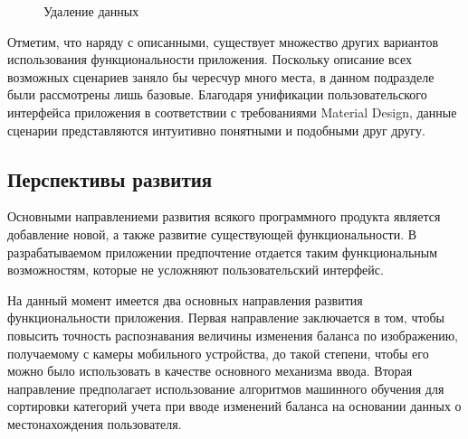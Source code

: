 \begin{figure}[h!]
  \centering
  \caption{Удаление данных}
  \label{fig:implementation_manual_remove}
\end{figure}

Отметим, что наряду с описанными, существует множество других вариантов
использования функциональности приложения.
Поскольку описание всех возможных сценариев заняло бы
чересчур много места, в данном подразделе были рассмотрены лишь базовые.
Благодаря унификации пользовательского интерфейса приложения
в соответствии с требованиями Material Design, данные сценарии представляются
интуитивно понятными и подобными друг другу.

\subsection{Перспективы развития}

Основными направлениеми развития всякого программного продукта является
добавление новой, а также развитие существующей функциональности.
В разрабатываемом приложении предпочтение отдается таким функциональным
возможностям, которые не усложняют пользовательский интерфейс.

На данный момент имеется два основных направления развития функциональности приложения.
Первая направление заключается в том, чтобы повысить точность распознавания величины
изменения баланса по изображению, получаемому с камеры мобильного устройства,
до такой степени, чтобы его можно было использовать в качестве основного механизма ввода.
Вторая направление предполагает использование алгоритмов машинного обучения
для сортировки категорий учета при вводе изменений баланса на основании
данных о местонахождения пользователя.
